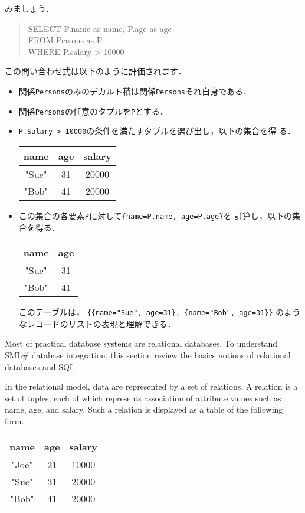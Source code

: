 \documentclass{jbook}
\newcommand{\smlsharp}{SML\#}
\newenvironment{program}{\begin{tt}\begin{quote}}{\end{quote}\end{tt}}
\begin{document}
みましょう．
\begin{program}
SELECT P.name as name, P.age as age\\
FROM Persons as P\\
WHERE P.salary > 10000
\end{program}
	この問い合わせ式は以下のように評価されます．
\begin{itemize}
\item 関係{\tt Persons}のみのデカルト積は関係{\tt Persons}それ自身である．
\item 関係{\tt Persons}の任意のタプルを{\tt P}とする．
\item {\tt P.Salary > 10000}の条件を満たすタプルを選び出し，以下の集合を得
る．

\begin{center}
\begin{tabular}{|c|c|c|}
\hline
name & age & salary
\\\hline
"Sue" & 31 & 20000
\\\hline
"Bob" & 41 & 20000
\\\hline
\end{tabular}
\end{center}
\item この集合の各要素{\tt P}に対して{\tt \{name=P.name, age=P.age\}}を
計算し，以下の集合を得る．

\begin{center}
\begin{tabular}{|c|c|}
\hline
name & age
\\\hline
"Sue" & 31
\\\hline
"Bob" & 41
\\\hline
\end{tabular}
\end{center}
このテーブルは，
{\tt \{\{name="Sue", age=31\}, \{name="Bob", age=31\}\}}
のようなレコードのリストの表現と理解できる．
\end{itemize}
\else%
	Most of practical database systems are relational databases.
	To understand \smlsharp{} database integration, this section
review the basics notions of relational databases and SQL.

	In the relational model, data are represented by a set of
relations.
	A relation is a set of tuples, each of which represents
association of attribute values such as name, age, and salary.
	Such a relation is displayed as a table of the following form.

\begin{center}
\begin{tabular}{|c|c|c|}
\hline
name & age & salary
\\\hline
"Joe" & 21 & 10000
\\\hline
"Sue" & 31 & 20000
\\\hline
"Bob" & 41 & 20000
\\\hline
\end{tabular}
\end{center}
\end{document}
